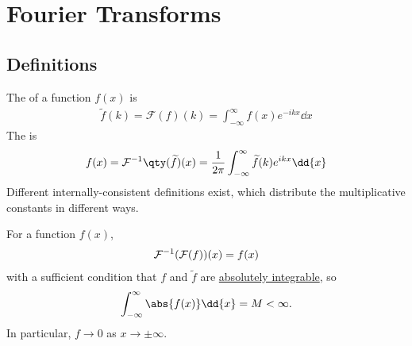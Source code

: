 \section{Fourier Transforms}

\subsection{Definitions}
\begin{definition}
	The  of a function $f(x)$ is
	\begin{align} \label{eq:8.1}
		\widetilde f(k) = \mathcal F(f)(k) = \int_{-\infty}^\infty f(x) e^{-ikx} \dd{x}
	\end{align}
	The  is
	\begin{align} \label{eq:8.2}
		f(x) = \mathcal F\inv\qty(\widetilde f)(x) = \frac{1}{2\pi} \int_{-\infty}^\infty \widetilde f(k) e^{ikx} \dd{x}
	\end{align}
	Different internally-consistent definitions exist, which distribute the multiplicative constants in different ways.
\end{definition}

\begin{theorem}
	For a function $f(x)$,
	\begin{align} \label{eq:8.3}
		\mathcal F^{-1} (\mathcal F (f))(x) = f(x)
	\end{align}
	with a sufficient condition that $f$ and $\widetilde f$ are \underline{absolutely integrable}, so
	\begin{align*}
		\int_{-\infty}^\infty \abs{f(x)} \dd{x} = M < \infty.
	\end{align*}
	In particular, $f \to 0$ as $x \to \pm \infty$.
\end{theorem}

